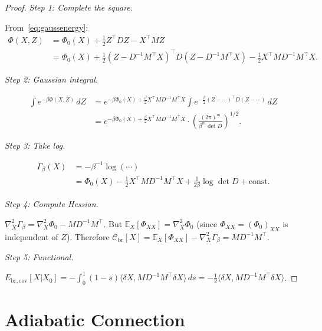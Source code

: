 \documentclass[12pt]{article}
\theoremstyle{plain}
\theoremstyle{definition}
\numberwithin{equation}{section}
\newcommand{\br}{\mathrm{br}}
\begin{document}
\begin{proof}
\emph{Step 1: Complete the square.}

From~\eqref{eq:gaussenergy}:
\begin{align}
\Phi(X,Z) &= \Phi_0(X)+\tfrac{1}{2}Z^\top DZ-X^\top MZ\\
&= \Phi_0(X)+\tfrac{1}{2}(Z-D^{-1}M^\top X)^\top
D(Z-D^{-1}M^\top X)
-\tfrac{1}{2}X^\top MD^{-1}M^\top X.
\end{align}

\emph{Step 2: Gaussian integral.}

\begin{align}
\int e^{-\beta\Phi(X,Z)}\,dZ
&= e^{-\beta\Phi_0(X)+\frac{\beta}{2}X^\top MD^{-1}M^\top X}
\int e^{-\frac{\beta}{2}(Z-\cdots)^\top D(Z-\cdots)}\,dZ\\
&= e^{-\beta\Phi_0(X)+\frac{\beta}{2}X^\top MD^{-1}M^\top X}
\cdot\left(\frac{(2\pi)^m}{\beta^m\det D}\right)^{1/2}.
\end{align}

\emph{Step 3: Take log.}

\begin{align}
\Gamma_\beta(X) &= -\beta^{-1}\log(\cdots)\\
&= \Phi_0(X)-\tfrac{1}{2}X^\top MD^{-1}M^\top X
+\frac{1}{2\beta}\log\det D+\text{const}.
\end{align}

\emph{Step 4: Compute Hessian.}

$\nabla_X^2\Gamma_\beta=\nabla_X^2\Phi_0-MD^{-1}M^\top$.
But $\mathbb{E}_X[\Phi_{XX}]=\nabla_X^2\Phi_0$
(since $\Phi_{XX}=(\Phi_0)_{XX}$ is independent of $Z$).
Therefore $\mathcal{C}_{\br}[X]=\mathbb{E}_X[\Phi_{XX}]-\nabla_X^2\Gamma_\beta=MD^{-1}M^\top$.

\emph{Step 5: Functional.}

$E_{\br,\mathrm{cov}}[X|X_0]
=-\int_0^1(1-s)\langle\delta X,MD^{-1}M^\top\delta X\rangle\,ds
=-\frac{1}{2}\langle\delta X,MD^{-1}M^\top\delta X\rangle$.
\end{proof}


\section{Adiabatic Connection}\label{sec:adiabatic}
\end{document}
